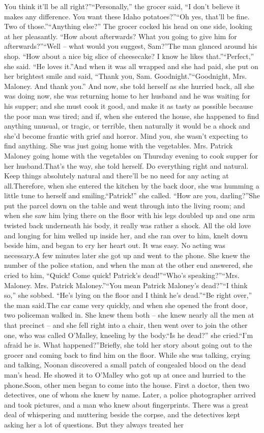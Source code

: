 \documentclass[11pt,a4paper]{article}
\begin{document}
{You think it’ll be all right?”“Personally,” the grocer said, “I don’t believe it makes any difference. You want these Idaho potatoes?”“Oh yes, that’ll be fine. Two of those.”“Anything else?” The grocer cocked his head on one side, looking at her pleasantly. “How about afterwards? What you going to give him for afterwards?”“Well – what would you suggest, Sam?”The man glanced around his shop. “How about a nice big slice of cheesecake? I know he likes that.”“Perfect,” she said. “He loves it.”And when it was all wrapped and she had paid, she put on her brightest smile and said, “Thank you, Sam. Goodnight.”“Goodnight, Mrs. Maloney. And thank you.” And now, she told herself as she hurried back, all she was doing now, she was returning home to her husband and he was waiting for his supper; and she must cook it good, and make it as tasty as possible because the poor man was tired; and if, when she entered the house, she happened to find anything unusual, or tragic, or terrible, then naturally it would be a shock and she’d become frantic with grief and horror. Mind you, she wasn’t expecting to find anything. She was just going home with the vegetables. Mrs. Patrick Maloney going home with the vegetables on Thursday evening to cook supper for her husband.That’s the way, she told herself. Do everything right and natural. Keep things absolutely natural and there’ll be no need for any acting at all.Therefore, when she entered the kitchen by the back door, she was humming a little tune to herself and smiling.“Patrick!” she called. “How are you, darling?”She put the parcel down on the table and went through into the living room; and when she saw him lying there on the floor with his legs doubled up and one arm twisted back underneath his body, it really was rather a shock. All the old love and longing for him welled up inside her, and she ran over to him, knelt down beside him, and began to cry her heart out. It was easy. No acting was necessary.A few minutes later she got up and went to the phone. She knew the number of the police station, and when the man at the other end answered, she cried to him, “Quick! Come quick! Patrick’s dead!”“Who’s speaking?”“Mrs. Maloney. Mrs. Patrick Maloney.”“You mean Patrick Maloney’s dead?”“I think so,” she sobbed. “He’s lying on the floor and I think he’s dead.”“Be right over,” the man said.The car came very quickly, and when she opened the front door, two policeman walked in. She knew them both – she knew nearly all the men at that precinct – and she fell right into a chair, then went over to join the other one, who was called O’Malley, kneeling by the body.“Is he dead?” she cried.“I’m afraid he is. What happened?”Briefly, she told her story about going out to the grocer and coming back to find him on the floor. While she was talking, crying and talking, Noonan discovered a small patch of congealed blood on the dead man’s head. He showed it to O’Malley who got up at once and hurried to the phone.Soon, other men began to come into the house. First a doctor, then two detectives, one of whom she knew by name. Later, a police photographer arrived and took pictures, and a man who knew about fingerprints. There was a great deal of whispering and muttering beside the corpse, and the detectives kept asking her a lot of questions. But they always treated her }
\end{document}
